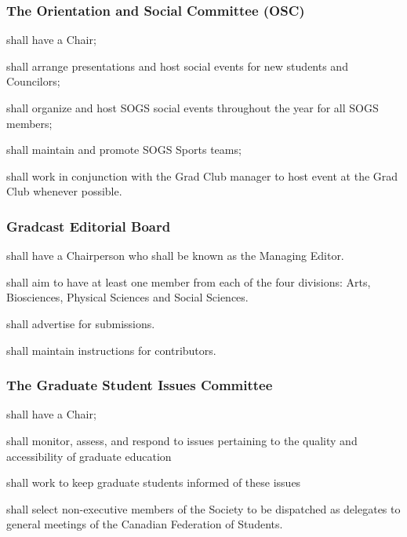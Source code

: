 \subsubsection{The Orientation and Social Committee (OSC)}
\begin{longenum}[ label*=\thesubsubsection.\arabic*., align=left]
	\item shall have a Chair;
    \item shall arrange presentations and host social events for new students and Councilors;
    \item shall organize and host SOGS social events throughout the year for all SOGS members;
    \item shall maintain and promote SOGS Sports teams;
    \item shall work in conjunction with the Grad Club manager to host event at the Grad Club whenever possible.

\end{longenum}
 
\subsubsection{Gradcast  Editorial Board}
\begin{longenum}[ label*=\thesubsubsection.\arabic*., align=left]
	\item  shall have a Chairperson who shall be known as the Managing Editor.
    \item shall aim to have at least one member from each of the four divisions: Arts, Biosciences, Physical Sciences and Social Sciences.
    \item shall advertise for submissions. 
    \item shall maintain instructions for contributors.
\end{longenum}
 
\subsubsection{The Graduate Student Issues Committee}
\begin{longenum}[ label*=\thesubsubsection.\arabic*., align=left]
	\item shall have a Chair;
    \item shall monitor,  assess, and respond to issues pertaining to the quality and accessibility of graduate education
    \item shall work to keep graduate students informed of these issues
    \item shall select non-executive members of the Society to be dispatched as delegates to general meetings of the Canadian Federation of Students.
\end{longenum}

